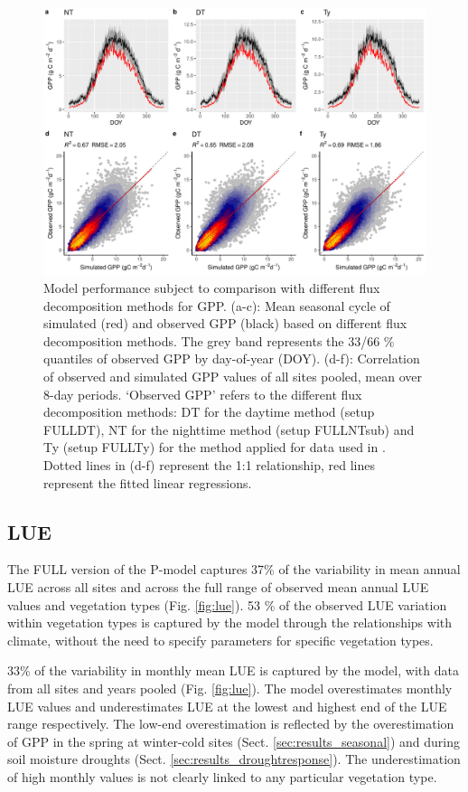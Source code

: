 \documentclass{myreport}
\begin{document}
 \begin{figure}[!ht]
\includegraphics[width=\textwidth]{fig/meandoy_modobs_gpp_data.pdf}
    \caption{Model performance subject to comparison with different flux decomposition methods for GPP. (a-c): Mean seasonal cycle of simulated (red) and observed GPP (black) based on different flux decomposition methods. The grey band represents the 33/66 \% quantiles of observed GPP by day-of-year (DOY). (d-f): Correlation of observed and simulated GPP values of all sites pooled, mean over 8-day periods. `Observed GPP' refers to the different flux decomposition methods: DT for the daytime method (setup FULL\textunderscore DT), NT for the nighttime method (setup FULL\textunderscore NTsub) and Ty (setup FULL\textunderscore Ty) for the method applied for data used in \citet{wang17rs}. Dotted lines in (d-f) represent the 1:1 relationship, red lines represent the fitted linear regressions.}
    \label{fig:modobs_10d_gppdata}
\end{figure}


\subsection{LUE}
\label{sec:results_lue}
The FULL version of the P-model captures 37\% of the variability in mean annual LUE across all sites and across the full range of observed mean annual LUE values and vegetation types (Fig. \ref{fig:lue}). 53 \% of the observed LUE variation within vegetation types is captured by the model through the relationships with climate, without the need to specify parameters for specific vegetation types. 

33\% of the variability in monthly mean LUE is captured by the model, with data from all sites and years pooled (Fig. \ref{fig:lue}). The model overestimates monthly LUE values and underestimates LUE at the lowest and highest end of the LUE range respectively. The low-end overestimation is reflected by the overestimation of GPP in the spring at winter-cold sites (Sect. \ref{sec:results_seasonal}) and during soil moisture droughts (Sect. \ref{sec:results_droughtresponse}). The underestimation of high monthly values is not clearly linked to any particular vegetation type.
\end{document}
